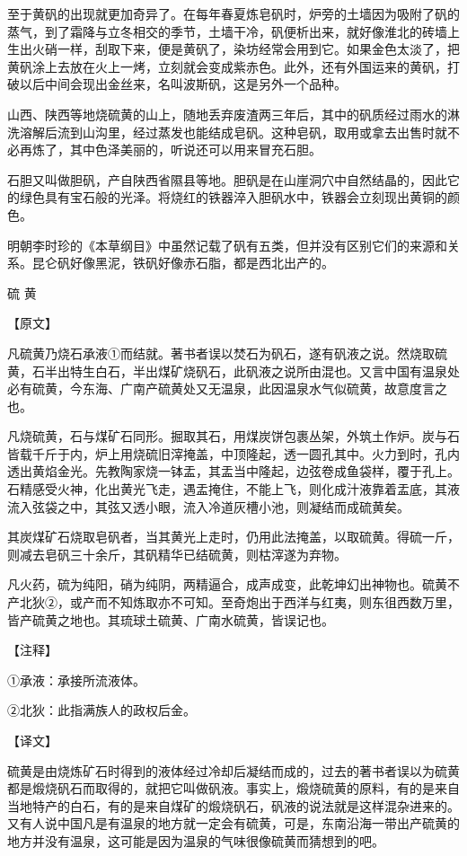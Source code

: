 \documentclass[12pt,UTF8]{ctexbook}
\begin{document}
至于黄矾的出现就更加奇异了。在每年春夏炼皂矾时，炉旁的土墙因为吸附了矾的蒸气，到了霜降与立冬相交的季节，土墙干冷，矾便析出来，就好像淮北的砖墙上生出火硝一样，刮取下来，便是黄矾了，染坊经常会用到它。如果金色太淡了，把黄矾涂上去放在火上一烤，立刻就会变成紫赤色。此外，还有外国运来的黄矾，打破以后中间会现出金丝来，名叫波斯矾，这是另外一个品种。

山西、陕西等地烧硫黄的山上，随地丢弃废渣两三年后，其中的矾质经过雨水的淋洗溶解后流到山沟里，经过蒸发也能结成皂矾。这种皂矾，取用或拿去出售时就不必再炼了，其中色泽美丽的，听说还可以用来冒充石胆。

石胆又叫做胆矾，产自陕西省隰县等地。胆矾是在山崖洞穴中自然结晶的，因此它的绿色具有宝石般的光泽。将烧红的铁器淬入胆矾水中，铁器会立刻现出黄铜的颜色。

明朝李时珍的《本草纲目》中虽然记载了矾有五类，但并没有区别它们的来源和关系。昆仑矾好像黑泥，铁矾好像赤石脂，都是西北出产的。

硫 黄

【原文】

凡硫黄乃烧石承液①而结就。著书者误以焚石为矾石，遂有矾液之说。然烧取硫黄，石半出特生白石，半出煤矿烧矾石，此矾液之说所由混也。又言中国有温泉处必有硫黄，今东海、广南产硫黄处又无温泉，此因温泉水气似硫黄，故意度言之也。

凡烧硫黄，石与煤矿石同形。掘取其石，用煤炭饼包裹丛架，外筑土作炉。炭与石皆载千斤于内，炉上用烧硫旧滓掩盖，中顶隆起，透一圆孔其中。火力到时，孔内透出黄焰金光。先教陶家烧一钵盂，其盂当中隆起，边弦卷成鱼袋样，覆于孔上。石精感受火神，化出黄光飞走，遇盂掩住，不能上飞，则化成汁液靠着盂底，其液流入弦袋之中，其弦又透小眼，流入冷道灰槽小池，则凝结而成硫黄矣。

其炭煤矿石烧取皂矾者，当其黄光上走时，仍用此法掩盖，以取硫黄。得硫一斤，则减去皂矾三十余斤，其矾精华已结硫黄，则枯滓遂为弃物。

凡火药，硫为纯阳，硝为纯阴，两精逼合，成声成变，此乾坤幻出神物也。硫黄不产北狄②，或产而不知炼取亦不可知。至奇炮出于西洋与红夷，则东徂西数万里，皆产硫黄之地也。其琉球土硫黄、广南水硫黄，皆误记也。

【注释】

①承液：承接所流液体。

②北狄：此指满族人的政权后金。

【译文】

硫黄是由烧炼矿石时得到的液体经过冷却后凝结而成的，过去的著书者误以为硫黄都是煅烧矾石而取得的，就把它叫做矾液。事实上，煅烧硫黄的原料，有的是来自当地特产的白石，有的是来自煤矿的煅烧矾石，矾液的说法就是这样混杂进来的。又有人说中国凡是有温泉的地方就一定会有硫黄，可是，东南沿海一带出产硫黄的地方并没有温泉，这可能是因为温泉的气味很像硫黄而猜想到的吧。
\end{document}
